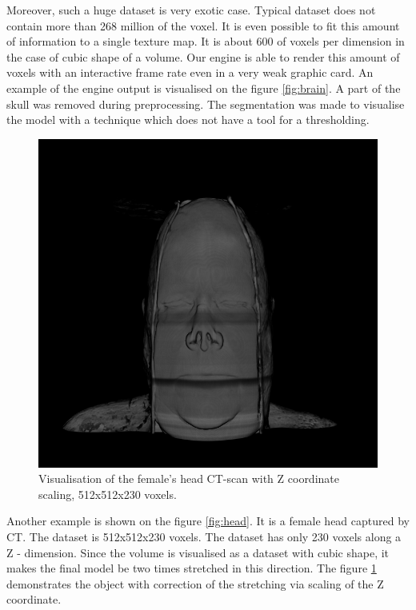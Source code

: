 \documentclass[twoside, english, 11pt]{report}
\begin{document}
Moreover, such a huge dataset is very exotic case. Typical dataset does not contain more than 268 million of the voxel. It is even possible to fit this amount of information to a single texture map. It is about 600 of voxels per dimension in the case of cubic shape of a volume. Our engine is able to render this amount of voxels with an interactive frame rate even in a very weak graphic card. An example of the engine output is visualised on the figure \ref{fig:brain}. A part of the skull was removed during preprocessing. The segmentation was made to visualise the model with a technique which does not have a tool for a thresholding.\\


\begin{figure}[H]
\centerline{\includegraphics[scale = 0.65]{img/head-zcor}}
\caption{Visualisation of the female's head CT-scan with Z coordinate scaling, 512x512x230 voxels.\label{fig:head-zcor}}
\end{figure}
Another example is shown on the figure \ref{fig:head}. It is a female head captured by CT. The dataset is 512x512x230 voxels. The dataset has only 230 voxels along a Z - dimension. Since the volume is visualised as a dataset with cubic shape, it makes the final model be two times stretched in this direction. The figure \ref{fig:head-zcor} demonstrates the object with correction of the stretching via scaling of the Z coordinate.\\
\end{document}

